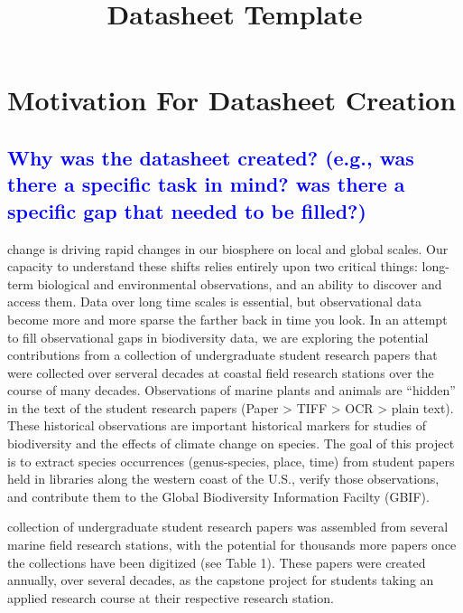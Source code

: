 \documentclass[letterpaper, 10 pt, conference]{ieeeconf}  %
\title{\LARGE \bf
Datasheet Template
}
\begin{document}
\maketitle
\thispagestyle{empty}
\pagestyle{empty}

\section{Motivation For Datasheet Creation}

\textcolor{blue}{\subsection{Why was the datasheet created? (e.g., was there a specific task in mind? was there a specific gap that needed to
be filled?)}}

\Climate change is driving rapid changes in our biosphere on local and global scales. Our capacity to understand these shifts relies entirely upon two critical things: long-term biological and environmental observations, and an ability to discover and access them. Data over long time scales is essential, but observational data become more and more sparse the farther back in time you look. In an attempt to fill observational gaps in biodiversity data, we are exploring the potential contributions from a collection of undergraduate student research papers that were collected over serveral decades at coastal field research stations over the course of many decades. Observations of marine plants and animals are “hidden” in the text of the student research papers (Paper > TIFF > OCR > plain text). These historical observations are important historical markers for studies of biodiversity and the effects of climate change on species. The goal of this project is to extract species occurrences (genus-species, place, time) from student papers held in libraries along the western coast of the U.S., verify those observations, and contribute them to the Global Biodiversity Information Facilty (GBIF).

\This collection of undergraduate student research papers was assembled from several marine field research stations, with the potential for thousands more papers once the collections have been digitized (see Table 1). These papers were created annually, over several decades, as the capstone project for students taking an applied research course at their respective research station. 
\end{document}
